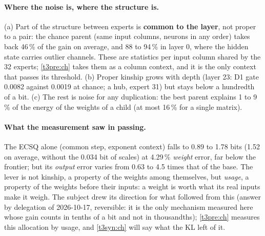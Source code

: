 \paragraph{Where the noise is, where the structure is.} (a) Part of the structure between experts is \textbf{common to the layer}, not proper to a pair: the chance parent (same input columns, neurons in any order) takes back 46\,\% of the gain on average, and 88 to 94\,\% in layer 0, where the hidden state carries outlier channels. These are statistics per input column shared by the 32 experts; \cref{t3pre:ch} takes them as a column context, and it is the only context that passes its threshold. (b) Proper kinship grows with depth (layer 23: D1 gate 0.0082 against 0.0019 at chance; a hub, expert 31) but stays below a hundredth of a bit. (c) The rest is noise for any duplication: the best parent explains 1 to 9\,\% of the energy of the weights of a child (at most 16\,\% for a single matrix).

\paragraph{What the measurement saw in passing.} The ECSQ alone (common step, exponent context) falls to 0.89 to 1.78 bits (1.52 on average, without the 0.034 bit of scales) at 4.29\,\% \emph{weight} error, far below the frontier; but its \emph{output} error varies from 0.63 to 4.5 times that of the base. The lever is not kinship, a property of the weights among themselves, but \emph{usage}, a property of the weights before their inputs: a weight is worth what its real inputs make it weigh. The subject drew its direction for what followed from this (answer by delegation of 2026-10-17, reversible: it is the only mechanism measured here whose gain counts in tenths of a bit and not in thousandths); \cref{t3pre:ch} measures this allocation by usage, and \cref{t3syn:ch} will say what the KL left of it.

